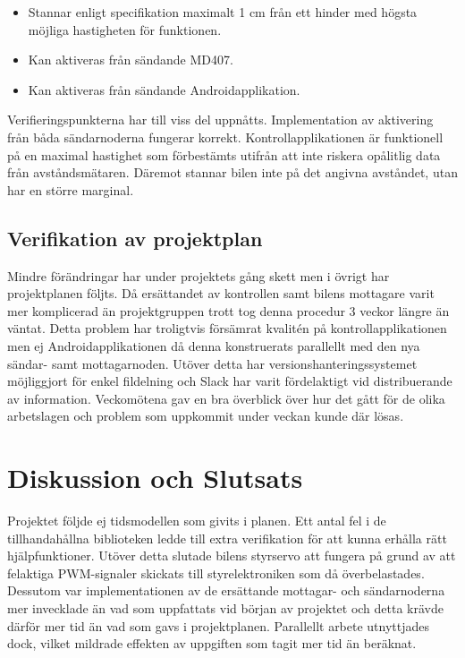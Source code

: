 \documentclass[a4paper]{article}
\begin{document}
\begin{itemize}
\item Stannar enligt specifikation maximalt 1 cm från ett hinder med högsta möjliga hastigheten för funktionen.
\item Kan aktiveras från sändande MD407.
\item Kan aktiveras från sändande Androidapplikation.
\end{itemize}


\noindent
Verifieringspunkterna har till viss del uppnåtts. Implementation av aktivering från båda sändarnoderna fungerar korrekt. Kontrollapplikationen är funktionell på en maximal hastighet som förbestämts utifrån att inte riskera opålitlig data från avståndsmätaren. Däremot stannar bilen inte på det angivna avståndet, utan har en större marginal.


\subsection{Verifikation av projektplan}
Mindre förändringar har under projektets gång skett men i övrigt har projektplanen följts. Då ersättandet av kontrollen samt bilens  mottagare varit mer komplicerad än projektgruppen trott tog denna procedur 3 veckor längre än väntat. Detta problem har troligtvis försämrat kvalitén på kontrollapplikationen men ej Androidapplikationen då denna konstruerats parallellt med den nya sändar- samt mottagarnoden. Utöver detta har versionshanteringssystemet möjliggjort för enkel fildelning och Slack har varit fördelaktigt vid distribuerande av information. Veckomötena gav en bra överblick över hur det gått för de olika arbetslagen och problem som uppkommit under veckan kunde där lösas.



\newpage
\section{Diskussion och Slutsats}

Projektet följde ej tidsmodellen som givits i planen. Ett antal fel i de tillhandahållna biblioteken ledde till extra verifikation för att kunna erhålla rätt hjälpfunktioner. Utöver detta slutade bilens styrservo att fungera på grund av att felaktiga PWM-signaler skickats till styrelektroniken som då överbelastades. Dessutom var implementationen av de ersättande mottagar- och sändarnoderna mer invecklade än vad som uppfattats vid början av projektet och detta krävde därför mer tid än vad som gavs i projektplanen. Parallellt arbete utnyttjades dock, vilket mildrade effekten av uppgiften som tagit mer tid än beräknat.
\end{document}
